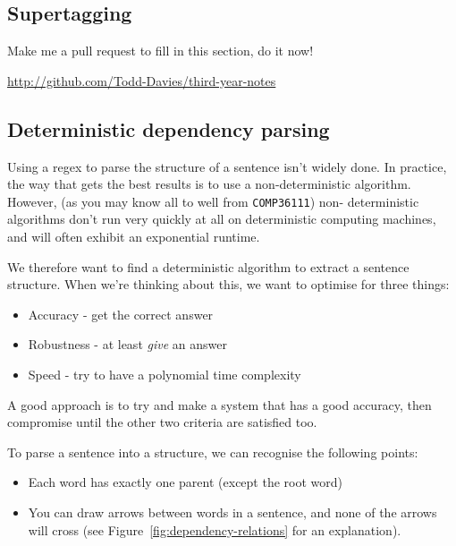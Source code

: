\subsection{Supertagging}


Make me a pull request to fill in this section, do it now!

\url{http://github.com/Todd-Davies/third-year-notes}{}


\subsection{Deterministic dependency parsing}

Using a regex to parse the structure of a sentence isn't widely done. In
practice, the way that gets the best results is to use a non-deterministic
algorithm. However, (as you may know all to well from \texttt{COMP36111}) non-
deterministic algorithms don't run very quickly at all on deterministic
computing machines, and will often exhibit an exponential runtime.

We therefore want to find a deterministic algorithm to extract a sentence
structure. When we're thinking about this, we want to optimise for three things:

\begin{itemize}
  \item Accuracy - get the correct answer
  \item Robustness - at least \textit{give} an answer
  \item Speed - try to have a polynomial time complexity
\end{itemize}

A good approach is to try and make a system that has a good accuracy, then
compromise until the other two criteria are satisfied too.

To parse a sentence into a structure, we can recognise the following points:

\begin{itemize}
  \item Each word has exactly one parent (except the root word)
  \item You can draw arrows between words in a sentence, and none of the arrows 
  will cross (see Figure~\ref{fig:dependency-relations} for an explanation).
\end{itemize}

